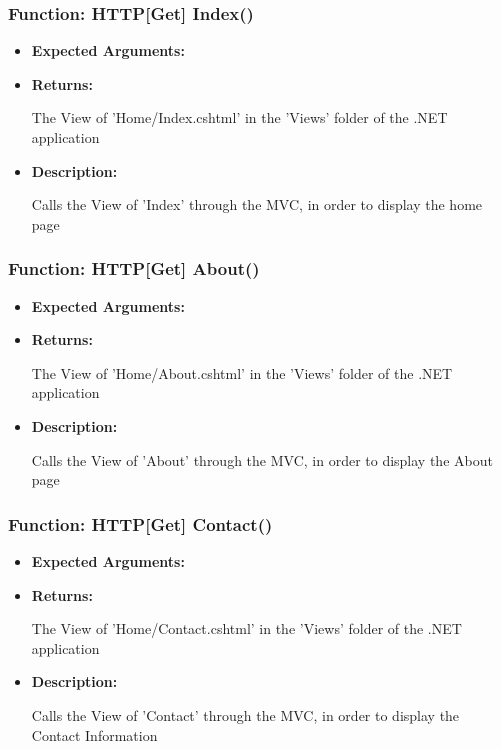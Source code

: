 \documentclass{scrreprt}
\begin{document}
\subsubsection{Function: HTTP[Get] Index()}
\begin{itemize}
    \item \textbf{Expected Arguments:}
    \item \textbf{Returns:}

    The View of 'Home/Index.cshtml' in the 'Views' folder of the .NET application

    \item \textbf{Description:}

    Calls the View of 'Index' through the MVC, in order to display the home page
\end{itemize}

\subsubsection{Function: HTTP[Get] About()}
\begin{itemize}
    \item \textbf{Expected Arguments:}
    \item \textbf{Returns:}

    The View of 'Home/About.cshtml' in the 'Views' folder of the .NET application

    \item \textbf{Description:}

    Calls the View of 'About' through the MVC, in order to display the About page
\end{itemize}

\subsubsection{Function: HTTP[Get] Contact()}
\begin{itemize}
    \item \textbf{Expected Arguments:}
    \item \textbf{Returns:}

    The View of 'Home/Contact.cshtml' in the 'Views' folder of the .NET application

    \item \textbf{Description:}

    Calls the View of 'Contact' through the MVC, in order to display the Contact Information
\end{itemize}
\end{document}
